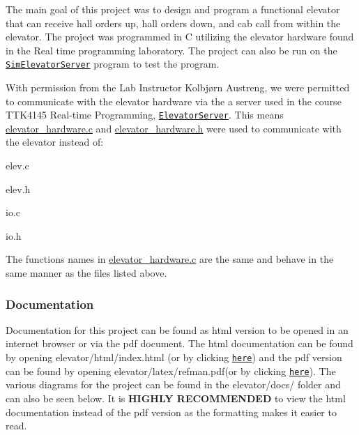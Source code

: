 The main goal of this project was to design and program a functional elevator that can receive hall orders up, hall orders down, and cab call from within the elevator. The project was programmed in C utilizing the elevator hardware found in the Real time programming laboratory. The project can also be run on the \href{https://github.com/TTK4145/Simulator-v2}{\tt {\ttfamily Sim\+Elevator\+Server}} program to test the program.

With permission from the Lab Instructor Kolbjørn Austreng, we were permitted to communicate with the elevator hardware via the a server used in the course T\+T\+K4145 Real-\/time Programming, \href{https://github.com/TTK4145/elevator-server}{\tt {\ttfamily Elevator\+Server}}. This means {\ttfamily \hyperlink{elevator__hardware_8c}{elevator\+\_\+hardware.\+c}} and {\ttfamily \hyperlink{elevator__hardware_8h}{elevator\+\_\+hardware.\+h}} were used to communicate with the elevator instead of\+:


\begin{DoxyItemize}
\item {\ttfamily elev.\+c}
\item {\ttfamily elev.\+h}
\item {\ttfamily io.\+c}
\item {\ttfamily io.\+h}
\end{DoxyItemize}

The functions names in {\ttfamily \hyperlink{elevator__hardware_8c}{elevator\+\_\+hardware.\+c}} are the same and behave in the same manner as the files listed above. 



\subsubsection*{Documentation}

Documentation for this project can be found as html version to be opened in an internet browser or via the pdf document. The html documentation can be found by opening {\ttfamily elevator/html/index.\+html} (or by clicking \href{elevator/html/index.html}{\tt here}) and the {\ttfamily pdf} version can be found by opening {\ttfamily elevator/latex/refman.\+pdf}(or by clicking \href{elevator/latex/refman.pdf}{\tt here}). The various diagrams for the project can be found in the {\ttfamily elevator/docs/} folder and can also be seen below. It is {\bfseries H\+I\+G\+H\+LY R\+E\+C\+O\+M\+M\+E\+N\+D\+ED} to view the {\ttfamily html} documentation instead of the {\ttfamily pdf} version as the formatting makes it easier to read. 



